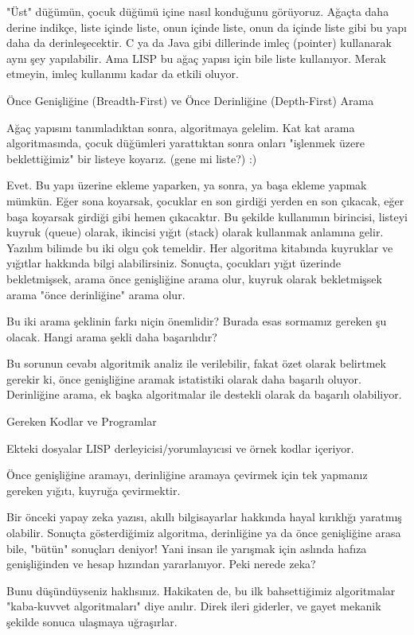 \documentclass[12pt,fleqn]{article}\usepackage{../../common}
\begin{document}
"Üst" düğümün, çocuk düğümü içine nasıl konduğunu görüyoruz. Ağaçta daha
derine indikçe, liste içinde liste, onun içinde liste, onun da içinde liste
gibi bu yapı daha da derinleşecektir. C ya da Java gibi dillerinde imleç
(pointer) kullanarak aynı şey yapılabilir. Ama LISP bu ağaç yapısı için
bile liste kullanıyor. Merak etmeyin, imleç kullanımı kadar da etkili
oluyor.

Önce Genişliğine (Breadth-First) ve Önce Derinliğine (Depth-First) Arama

Ağaç yapısını tanımladıktan sonra, algoritmaya gelelim. Kat kat arama
algoritmasında, çocuk düğümleri yarattıktan sonra onları "işlenmek üzere
beklettiğimiz" bir listeye koyarız. (gene mi liste?) :)

Evet. Bu yapı üzerine ekleme yaparken, ya sonra, ya başa ekleme yapmak
mümkün. Eğer sona koyarsak, çocuklar en son girdiği yerden en son çıkacak,
eğer başa koyarsak girdiği gibi hemen çıkacaktır. Bu şekilde kullanımın
birincisi, listeyi kuyruk (queue) olarak, ikincisi yığıt (stack) olarak
kullanmak anlamına gelir. Yazılım bilimde bu iki olgu çok temeldir. Her
algoritma kitabında kuyruklar ve yığıtlar hakkında bilgi
alabilirsiniz. Sonuçta, çocukları yığıt üzerinde bekletmişsek, arama önce
genişliğine arama olur, kuyruk olarak bekletmişsek arama "önce derinliğine"
arama olur.

Bu iki arama şeklinin farkı niçin önemlidir? Burada esas sormamız gereken
şu olacak. Hangi arama şekli daha başarılıdır?

Bu sorunun cevabı algoritmik analiz ile verilebilir, fakat özet olarak
belirtmek gerekir ki, önce genişliğine aramak istatistiki olarak daha
başarılı oluyor. Derinliğine arama, ek başka algoritmalar ile destekli
olarak da başarılı olabiliyor.

Gereken Kodlar ve Programlar

Ekteki dosyalar LISP derleyicisi/yorumlayıcısi ve örnek kodlar
içeriyor. 

Önce genişliğine aramayı, derinliğine aramaya çevirmek için tek yapmanız
gereken yığıtı, kuyruğa çevirmektir.

Bir önceki yapay zeka yazısı, akıllı bilgisayarlar hakkında hayal kırıklığı
yaratmış olabilir. Sonuçta gösterdiğimiz algoritma, derinliğine ya da önce
genişliğine arasa bile, "bütün" sonuçları deniyor! Yani insan ile yarışmak
için aslında hafıza genişliğinden ve hesap hızından yararlanıyor. Peki
nerede zeka?

Bunu düşündüyseniz haklısınız. Hakikaten de, bu ilk bahsettiğimiz
algoritmalar "kaba-kuvvet algoritmaları" diye anılır. Direk ileri giderler,
ve gayet mekanik şekilde sonuca ulaşmaya uğraşırlar.
\end{document}
